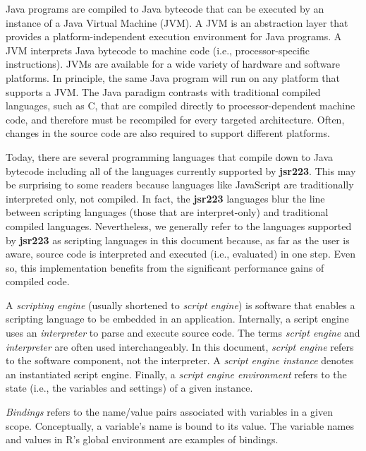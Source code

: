 Java programs are compiled to Java bytecode that can be executed by an instance of a Java Virtual Machine (JVM). A JVM is an abstraction layer that provides a platform-independent execution environment for Java programs. A JVM interprets Java bytecode to machine code (i.e., processor-specific instructions). JVMs are available for a wide variety of hardware and software platforms. In principle, the same Java program will run on any platform that supports a JVM. The Java paradigm contrasts with traditional compiled languages, such as C, that are compiled directly to processor-dependent machine code, and therefore must be recompiled for every targeted architecture. Often, changes in the source code are also required to support different platforms.

Today, there are several programming languages that compile down to Java bytecode including all of the languages currently supported by \textbf{jsr223}. This may be surprising to some readers because languages like JavaScript are traditionally interpreted only, not compiled. In fact, the \textbf{jsr223} languages blur the line between scripting languages (those that are interpret-only) and traditional compiled languages. Nevertheless, we generally refer to the languages supported by \textbf{jsr223} as scripting languages in this document because, as far as the user is aware, source code is interpreted and executed (i.e., evaluated) in one step. Even so, this implementation benefits from the significant performance gains of compiled code.

A \textit{scripting engine} (usually shortened to \textit{script engine}) is software that enables a scripting language to be embedded in an application. Internally, a script engine uses an \textit{interpreter} to parse and execute source code. The terms \textit{script engine} and \textit{interpreter} are often used interchangeably. In this document, \textit{script engine} refers to the software component, not the interpreter. A \textit{script engine instance} denotes an instantiated script engine. Finally, a \textit{script engine environment} refers to the state (i.e., the variables and settings) of a given instance.

\textit{Bindings} refers to the name/value pairs associated with variables in a given scope. Conceptually, a variable's name is bound to its value. The variable names and values in R's global environment are examples of bindings.
